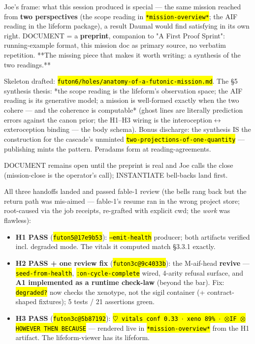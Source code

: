 \documentclass[11pt,oneside]{article}
\newcommand{\scopehl}[1]{\texttt{\hl{#1}}}
\begin{document}
\begin{phasebox}[title={7. DOCUMENT (opened 2026-06-10) --- "Anatomy of a Futonic Mission (from the HEAD down)"}]

Joe's frame: what this session produced is special --- the same mission reached
from \textbf{two perspectives} (the scope reading in \scopehl{*mission-overview*}; the AIF
reading in the lifeform package), a result Daumal would find satisfying in its
own right. DOCUMENT = a \textbf{preprint}, companion to "A First Proof Sprint":
running-example format, this mission doc as primary source, no verbatim
repetition. **The missing piece that makes it worth writing: a synthesis of
the two readings.**

Skeleton drafted: \scopehl{futon6/holes/anatomy-of-a-futonic-mission.md}. The \S{}5
synthesis thesis: *the scope reading is the lifeform's observation space; the
AIF reading is its generative model; a mission is well-formed exactly when
the two cohere --- and the coherence is computable* (ghost lines are literally
prediction errors against the canon prior; the H1--H3 wiring is the
interoception$\leftrightarrow$exteroception binding --- the body schema). Bonus discharge: the
synthesis IS the construction for the cascade's unminted
\scopehl{two-projections-of-one-quantity} --- publishing mints the pattern. Peradams
form at reading-agreements.

DOCUMENT remains open until the preprint is real and Joe calls the close
(mission-close is the operator's call); INSTANTIATE bell-backs land first.

\begin{subbox}[title={6.1 INSTANTIATE closed (2026-06-10) --- three bells, three folds, A2 satisfied}]

All three handoffs landed and passed fable-1 review (the bells rang back but
the return path was mis-aimed --- fable-1's resume ran in the wrong project
store; root-caused via the job receipts, re-grafted with explicit cwd; the
\emph{work} was flawless):

\begin{itemize}[leftmargin=1.2em,itemsep=1pt]
\item \textbf{H1 PASS} (\scopehl{futon5@17e9b53}): \scopehl{--emit-health} producer; both artifacts verified incl. degraded mode. The vitals it computed match \S{}3.3.1 exactly.
\item \textbf{H2 PASS + one review fix} (\scopehl{futon3c@9c4033b}): the M-aif-head \textbf{revive} --- \scopehl{seed-from-health}, \scopehl{:on-cycle-complete} wired, 4-arity refusal surface, and \textbf{A1 implemented as a runtime check-law} (beyond the bar). Fix: \scopehl{degraded?} now checks the xenotype, not the sigil container (+ contract- shaped fixtures); 5 tests / 21 assertions green.
\item \textbf{H3 PASS} (\scopehl{futon3c@5b87192}): \scopehl{$\heartsuit$ vitals conf 0.33 $\cdot$ xeno 89\% $\cdot$ $\otimes$IF $\otimes$HOWEVER \checkmark{}THEN \checkmark{}BECAUSE} --- rendered live in \scopehl{*mission-overview*} from the H1 artifact. The lifeform-viewer has its lifeform.
\end{itemize}


\end{subbox}
\end{phasebox}
\end{document}
